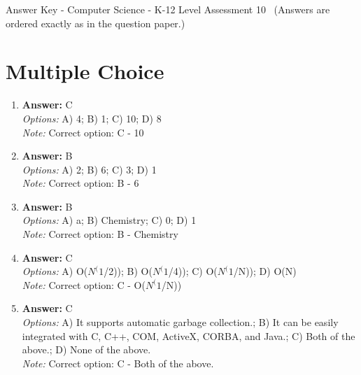 \documentclass[12pt]{article}
\begin{document}
\begin{center}
Answer Key - Computer Science - K-12 Level Assessment 10 \
\small (Answers are ordered exactly as in the question paper.)
\end{center}

\section*{Multiple Choice}
\begin{enumerate}[label=\arabic*.]
\item \textbf{Answer:} C
\\ \textit{Options:} A) 4; B) 1; C) 10; D) 8
\\ \textit{Note:} Correct option: C - 10
\item \textbf{Answer:} B
\\ \textit{Options:} A) 2; B) 6; C) 3; D) 1
\\ \textit{Note:} Correct option: B - 6
\item \textbf{Answer:} B
\\ \textit{Options:} A) a; B) Chemistry; C) 0; D) 1
\\ \textit{Note:} Correct option: B - Chemistry
\item \textbf{Answer:} C
\\ \textit{Options:} A) O($N^(1$/2)); B) O($N^(1$/4)); C) O($N^(1$/N)); D) O(N)
\\ \textit{Note:} Correct option: C - O($N^(1$/N))
\item \textbf{Answer:} C
\\ \textit{Options:} A) It supports automatic garbage collection.; B) It can be easily integrated with C, C++, COM, ActiveX, CORBA, and Java.; C) Both of the above.; D) None of the above.
\\ \textit{Note:} Correct option: C - Both of the above.
\end{enumerate}
\end{document}
